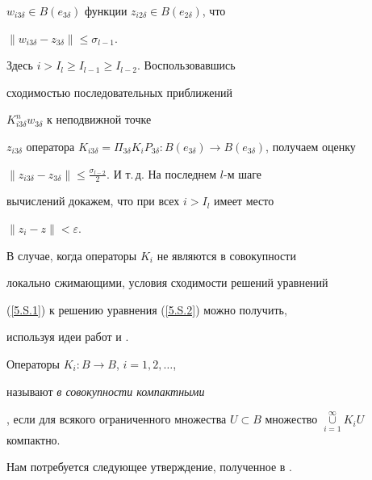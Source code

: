 \begin{pf}
$w_{i 3\delta}\in B(e_{3\delta})$ функции $z_{i 


2\delta}\in B(e_{2\delta})$, что


$\|w_{i 3\delta}-z_{3\delta}\|\leqslant \sigma_{l-1}$.


Здесь $i>I_l\geqslant I_{l-1}\geqslant I_{l-2}$. Воспользовавшись


сходимостью последовательных приближений


$K_{i 3\delta}^{n} w_{3\delta}$ к неподвижной точке


$z_{i 3\delta}$ оператора $K_{i 3\delta}=


\Pi_{3\delta} K_{i} P_{3\delta}:B(e_{3\delta})


\to B(e_{3\delta})$, получаем оценку


$\|z_{i 3\delta}-z_{3\delta}\|\leqslant


\frac{\sigma_{l-2}}{2}$. И т.\,д. На последнем $l$-м шаге


вычислений докажем, что при всех $i>I_l$ имеет место


$\|z_{i}-z\|< \varepsilon$.


\end{pf}








В случае, когда операторы $K_i$ не являются в совокупности


локально сжимающими, условия сходимости решений уравнений


(\ref{5.S.1}) к решению уравнения (\ref{5.S.2}) можно получить,


используя идеи работ \cite{Artst} и \cite{Maks2}.





Операторы $K_{i}:B \to B$, $i=1, 2, \dotsc$,


называют {\it в совокупности компактными}


\cite{Maks2}, если для всякого ограниченного множества $U \subset


B$ множество $\mathop{\cup}\limits_{i=1}^\infty K_{i} U$ компактно.





Нам потребуется следующее утверждение, полученное в \cite{Maks2}.








